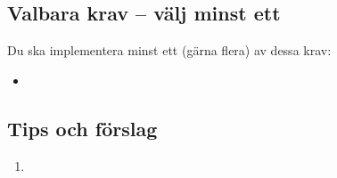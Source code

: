 \subsection{Valbara krav -- välj minst ett}

Du ska implementera minst ett (gärna flera) av dessa krav:
\begin{itemize}[nosep, label={$\square$}]
\item
\end{itemize}


\subsection{Tips och förslag}

\begin{enumerate}[leftmargin=*]
\item

\end{enumerate}
